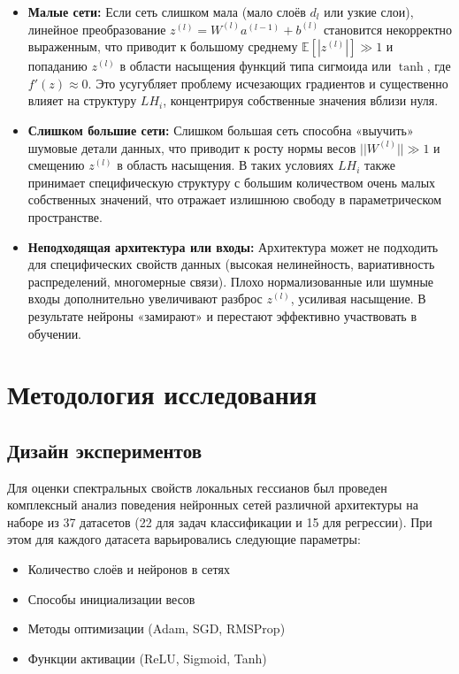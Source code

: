 \documentclass[a4paper,12pt]{article}
\begin{document}
\begin{itemize}
  \item \textbf{Малые сети:} Если сеть слишком мала (мало слоёв $d_l$ или узкие слои), линейное
    преобразование $z^{(l)}=W^{(l)}a^{(l-1)}+b^{(l)}$ становится некорректно выраженным, что приводит к
    большому среднему $\mathbb{E}[|z^{(l)}|]\gg1$ и попаданию $z^{(l)}$ в области насыщения функций типа
    сигмоида или $\tanh$, где $f'(z)\approx0$. Это усугубляет проблему исчезающих градиентов и существенно
    влияет на структуру $LH_i$, концентрируя собственные значения вблизи нуля.
  \item \textbf{Слишком большие сети:} Слишком большая сеть способна «выучить» шумовые детали данных, что
    приводит к росту нормы весов $||W^{(l)}||\gg1$ и смещению $z^{(l)}$ в область насыщения. В таких условиях
    $LH_i$ также принимает специфическую структуру с большим количеством очень малых собственных
    значений, что отражает излишнюю свободу в параметрическом пространстве.
  \item \textbf{Неподходящая архитектура или входы:} Архитектура может не подходить для специфических свойств
    данных (высокая нелинейность, вариативность распределений, многомерные связи). Плохо нормализованные или
    шумные входы дополнительно увеличивают разброс $z^{(l)}$, усиливая насыщение. В результате нейроны
    «замирают» и перестают эффективно участвовать в обучении.
\end{itemize}

\section{Методология исследования}

\subsection{Дизайн экспериментов}

Для оценки спектральных свойств локальных гессианов был проведен комплексный анализ поведения нейронных
сетей различной архитектуры на наборе из 37 датасетов (22 для задач классификации и 15 для регрессии). При
этом для каждого датасета варьировались следующие параметры:

\begin{itemize}
  \item Количество слоёв и нейронов в сетях
  \item Способы инициализации весов
  \item Методы оптимизации (Adam, SGD, RMSProp)
  \item Функции активации (ReLU, Sigmoid, Tanh)
\end{itemize}
\end{document}
